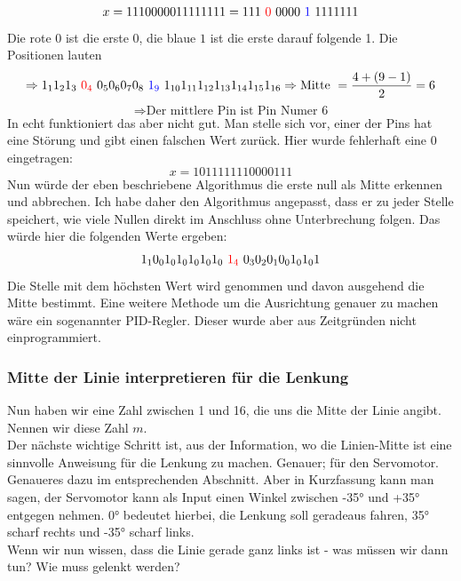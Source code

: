 	$$x=111 0 0000 1 1111111 = 111\mbox{ } \textcolor{red}{0} \mbox{ }0000\mbox{ } \textcolor{blue}{1}\mbox{ } 1111111$$
	Die rote $0$ ist die erste 0, die blaue $1$ ist die erste darauf folgende 1. Die Positionen lauten 
	$$\Rightarrow 1_1 1_2 1_3  \mbox{ } \textcolor{red}{0_4} \mbox{ } 0_5 0_6 0_7 0_8 \mbox{ } \textcolor{blue}{1_{9}}\mbox{ } 1_{10} 1_{11}  1_{12} 1_{13} 1_{14} 1_{15} 1_{16}\Rightarrow \text{Mitte } = \frac{4 + (9-1)}{2}=6 $$
	$$\Rightarrow \text{Der mittlere Pin ist Pin Numer 6}$$
	In echt funktioniert das aber nicht gut. Man stelle sich vor, einer der Pins hat eine Störung und gibt einen falschen Wert zurück. Hier wurde fehlerhaft eine 0 eingetragen:
	 $$x=1011111110000111$$
	Nun würde der eben beschriebene Algorithmus die erste null als Mitte erkennen und abbrechen. Ich habe daher den Algorithmus angepasst, dass er zu jeder Stelle speichert, wie viele Nullen direkt im Anschluss ohne Unterbrechung folgen. Das würde hier die folgenden Werte ergeben:
	$$1_10_01_01_01_01_01_0\mbox{ } \textcolor{red}{1_4} \mbox{ }0_30_20_10_01_01_01$$
	Die Stelle mit dem höchsten Wert wird genommen und davon ausgehend die Mitte bestimmt. Eine weitere Methode um die Ausrichtung genauer zu machen wäre ein sogenannter PID-Regler. Dieser wurde aber aus Zeitgründen nicht einprogrammiert.
	\subsubsection{Mitte der Linie interpretieren für die Lenkung}
	Nun haben wir eine Zahl zwischen 1 und 16, die uns die Mitte der Linie angibt. Nennen wir diese Zahl $m$.
	\\
	
	Der nächste wichtige Schritt ist, aus der Information, wo die Linien-Mitte ist eine sinnvolle Anweisung für die Lenkung zu machen. Genauer; für den Servomotor. Genaueres dazu im entsprechenden Abschnitt. Aber in Kurzfassung kann man sagen, der Servomotor kann als Input einen Winkel zwischen -35° und +35° entgegen nehmen. 0° bedeutet hierbei, die Lenkung soll geradeaus fahren, 35° scharf rechts und -35° scharf links. 
	\\
	Wenn wir nun wissen, dass die Linie gerade ganz links ist - was müssen wir dann tun? Wie muss gelenkt werden?
	
